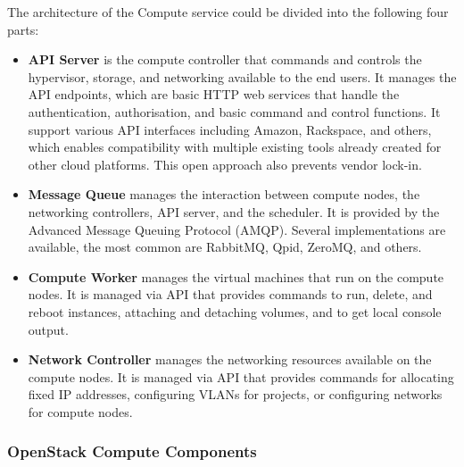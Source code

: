 The architecture of the Compute service could be divided into the following four parts:
\begin{itemize}
  \item{\textbf{API Server} is the compute controller that commands and controls the hypervisor, storage, and networking available to the end users. It manages the API endpoints, which are basic HTTP web services that handle the authentication, authorisation, and basic command and control functions. It support various API interfaces including Amazon, Rackspace, and others, which enables compatibility with multiple existing tools already created for other cloud platforms. This open approach also prevents vendor lock-in.}
  \item{\textbf{Message Queue} manages the interaction between compute nodes, the networking controllers, API server, and the scheduler. It is provided by the Advanced Message Queuing Protocol (AMQP). Several implementations are available, the most common are RabbitMQ, Qpid, ZeroMQ, and others.}
  \item{\textbf{Compute Worker} manages the virtual machines that run on the compute nodes. It is managed via API that provides commands to run, delete, and reboot instances, attaching and detaching volumes, and to get local console output.}
  \item{\textbf{Network Controller} manages the networking resources available on the compute nodes. It is managed via API that provides commands for allocating fixed IP addresses, configuring VLANs for projects, or configuring networks for compute nodes.}
  \\\cite{AdminGuide}
\end{itemize}

\subsubsection*{OpenStack Compute Components}

